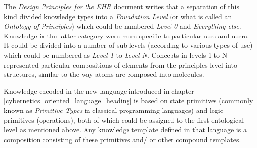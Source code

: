 The \emph{Design Principles for the EHR} document \cite{openehrdesign} writes
that a separation of this kind divided knowledge types into a
\emph{Foundation Level} (or what is called an \emph{Ontology of Principles})
which could be numbered \emph{Level 0} and \emph{Everything else}. Knowledge in
the latter category were more specific to particular uses and users. It could be
divided into a number of sub-levels (according to various types of use) which
could be numbered as \emph{Level 1} to \emph{Level N}. Concepts in levels 1 to N
represented particular compositions of elements from the principles level into
structures, similar to the way atoms are composed into molecules.

Knowledge encoded in the new language introduced in chapter
\ref{cybernetics_oriented_language_heading} is based on state primitives
(commonly known as \emph{Primitive Types} in classical programming languages)
and logic primitives (operations), both of which could be assigned to the first
ontological level as mentioned above. Any knowledge template defined in that
language is a composition consisting of these primitives and/ or other compound
templates.
